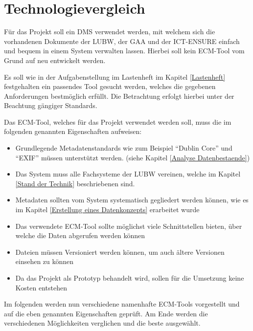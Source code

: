 \section{Technologievergleich}\label{Technologievergleich}
F\"ur das Projekt soll ein \ac{DMS} verwendet werden, mit welchem sich die vorhandenen Dokumente der \ac{LUBW}, der \ac{GAA} und der \ac{ICT-ENSURE} einfach und bequem in einem System verwalten lassen. Hierbei soll kein \ac{ECM}-Tool vom Grund auf neu entwickelt werden. 

Es soll wie in der Aufgabenstellung im Lastenheft im Kapitel \ref{Lastenheft} festgehalten ein passendes Tool gesucht werden, welches die gegebenen Anforderungen bestm\"oglich erf\"ullt. Die Betrachtung erfolgt hierbei unter der Beachtung g\"angiger Standards.

Das \ac{ECM}-Tool, welches f\"ur das Projekt verwendet werden soll, muss die im folgenden genannten Eigenschaften aufweisen:

\begin{itemize}
 \item Grundlegende Metadatenstandards wie zum Beispiel "`Dublin Core"' und "`EXIF"' m\"ussen unterst\"utzt werden. (siehe Kapitel \ref{Analyse Datenbestaende})
 \item Das System muss alle Fachsysteme der \ac{LUBW} vereinen, welche im Kapitel \ref{Stand der Technik} beschriebenen sind.
 \item Metadaten sollten vom System systematisch gegliedert werden k\"onnen, wie es im Kapitel \ref{Erstellung eines Datenkonzepts} erarbeitet wurde
 \item Das verwendete \ac{ECM}-Tool sollte m\"oglichst viele Schnittstellen bieten, \"uber welche die Daten abgerufen werden k\"onnen
 \item Dateien m\"ussen Versioniert werden k\"onnen, um auch \"altere Versionen einsehen zu k\"onnen
 \item Da das Projekt als Prototyp behandelt wird, sollen f\"ur die Umsetzung keine Kosten entstehen
\end{itemize}

Im folgenden werden nun verschiedene namenhafte \ac{ECM}-Tools vorgestellt und auf die eben genannten Eigenschaften gepr\"uft. Am Ende werden die verschiedenen M\"oglichkeiten verglichen und die beste ausgew\"ahlt.



